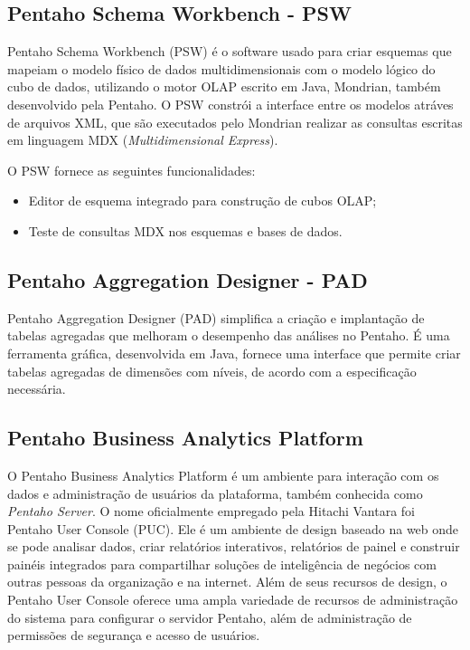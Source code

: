 \subsection{Pentaho Schema Workbench - PSW}
Pentaho Schema Workbench (PSW) é o software usado para criar esquemas que mapeiam o modelo físico de dados multidimensionais com o modelo lógico do cubo de dados, utilizando o motor OLAP escrito em Java, Mondrian, também desenvolvido pela Pentaho. O PSW constrói a interface entre os modelos atráves de arquivos XML, que são executados pelo Mondrian realizar as consultas escritas em linguagem MDX (\textit{Multidimensional Express}).

O PSW fornece as seguintes funcionalidades:

\begin{itemize}
    \item Editor de esquema integrado para construção de cubos OLAP;
    \item Teste de consultas MDX nos esquemas e bases de dados.
\end{itemize}

\subsection{Pentaho Aggregation Designer - PAD}
Pentaho Aggregation Designer (PAD) simplifica a criação e implantação de tabelas agregadas que melhoram o desempenho das análises no Pentaho. É uma ferramenta gráfica, desenvolvida em Java, fornece uma interface que permite criar tabelas agregadas de dimensões com níveis, de acordo com a especificação necessária.

\subsection{Pentaho Business Analytics Platform}
O Pentaho Business Analytics Platform é um ambiente para interação com os dados e administração de usuários da plataforma, também conhecida como \textit{Pentaho Server}. O nome oficialmente empregado pela Hitachi Vantara foi Pentaho User Console (PUC). Ele é um ambiente de design baseado na web onde se pode analisar dados, criar relatórios interativos, relatórios de painel e construir painéis integrados para compartilhar soluções de inteligência de negócios com outras pessoas da organização e na internet. Além de seus recursos de design, o Pentaho User Console oferece uma ampla variedade de recursos de administração do sistema para configurar o servidor Pentaho, além de administração de permissões de segurança e acesso de usuários.

